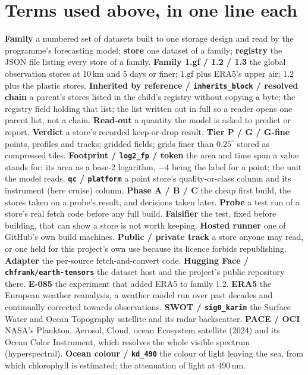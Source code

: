 \documentclass[10pt]{article}
\newcommand{\code}[1]{\texttt{#1}}
\begin{document}
\section*{Terms used above, in one line each}
\footnotesize
\textbf{Family} a numbered set of datasets built to one storage design and read by the programme's forecasting
model; \textbf{store} one dataset of a family; \textbf{registry} the JSON file listing every store of a family.
\textbf{Family 1.gf / 1.2 / 1.3} the global observation stores at 10\,km and 5 days or finer; 1.gf plus ERA5's
upper air; 1.2 plus the plastic stores. \textbf{Inherited by reference / \code{inherits\_block} / resolved chain}
a parent's stores listed in the child's registry without copying a byte; the registry field holding that list; the
list written out in full so a reader opens one parent list, not a chain. \textbf{Read-out} a quantity the model is
asked to predict or report. \textbf{Verdict} a store's recorded keep-or-drop result. \textbf{Tier P / G / G-fine}
points, profiles and tracks; gridded fields; grids finer than $0.25^\circ$ stored as compressed tiles.
\textbf{Footprint / \code{log2\_fp} / token} the area and time span a value stands for; its area as a base-2
logarithm, $-4$ being the label for a point; the unit the model reads. \textbf{\code{qc} / \code{platform}} a point
store's quality-or-class column and its instrument (here cruise) column. \textbf{Phase A / B / C} the cheap first
build, the stores taken on a probe's result, and decisions taken later. \textbf{Probe} a test run of a store's real
fetch code before any full build. \textbf{Falsifier} the test, fixed before building, that can show a store is not
worth keeping. \textbf{Hosted runner} one of GitHub's own build machines. \textbf{Public / private track} a store
anyone may read, or one held for this project's own use because its licence forbids republishing.
\textbf{Adapter} the per-source fetch-and-convert code. \textbf{Hugging Face / \code{chfrank/earth-tensors}} the
dataset host and the project's public repository there. \textbf{E-085} the experiment that added ERA5 to family 1.2.
\textbf{ERA5} the European weather reanalysis, a weather model run over past decades and continually corrected towards
observations. \textbf{SWOT / \code{sig0\_karin}} the Surface Water and Ocean Topography satellite and its radar
backscatter. \textbf{PACE / OCI} NASA's Plankton, Aerosol, Cloud, ocean Ecosystem satellite (2024) and its Ocean
Color Instrument, which resolves the whole visible spectrum (hyperspectral). \textbf{Ocean colour / \code{kd\_490}}
the colour of light leaving the sea, from which chlorophyll is estimated; the attenuation of light at 490\,nm.
\end{document}
